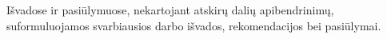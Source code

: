 \documentclass{VUMIFInfKursinis}
\begin{document}



Išvadose ir pasiūlymuose, nekartojant atskirų dalių apibendrinimų,
suformuluojamos svarbiausios darbo išvados, rekomendacijos bei pasiūlymai.



\printbibliography[heading=bibintoc] %

\appendix  %
%
\end{document}
